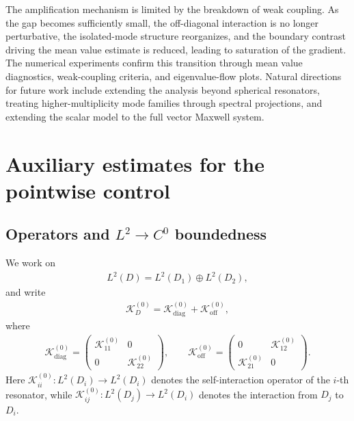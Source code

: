 \documentclass[10pt]{article}
\numberwithin{equation}{section}
\begin{document}
The amplification mechanism is limited by the breakdown of weak coupling. As the gap becomes sufficiently small, the off-diagonal interaction is no longer perturbative, the isolated-mode structure reorganizes, and the boundary contrast driving the mean value estimate is reduced, leading to saturation of the gradient. The numerical experiments confirm this transition through mean value diagnostics, weak-coupling criteria, and eigenvalue-flow plots. Natural directions for future work include extending the analysis beyond spherical resonators, treating higher-multiplicity mode families through spectral projections, and extending the scalar model to the full vector Maxwell system.











\appendix






\section{Auxiliary estimates for the pointwise control}
\label{app:Linfty-control}

\subsection{Operators and \texorpdfstring{$L^2\to C^0$}{} boundedness}

We work on
\begin{align*}
    L^2(D)=L^2(D_1)\oplus L^2(D_2),
\end{align*}
and write
\begin{align*}
    \mathcal{K}_D^{(0)}=\mathcal{K}_{\mathrm{diag}}^{(0)} + \mathcal{K}_{\mathrm{off}}^{(0)},
\end{align*}
where
\begin{align*}
    \mathcal{K}_{\mathrm{diag}}^{(0)}
    =
    \begin{pmatrix}
        \mathcal{K}_{11}^{(0)} & 0\\
        0 & \mathcal{K}_{22}^{(0)}
    \end{pmatrix},
    \qquad
    \mathcal{K}_{\mathrm{off}}^{(0)}
    =
    \begin{pmatrix}
        0 & \mathcal{K}_{12}^{(0)}\\
        \mathcal{K}_{21}^{(0)} & 0
    \end{pmatrix}.
\end{align*}
Here $\mathcal{K}_{ii}^{(0)}:L^2(D_i)\to L^2(D_i)$ denotes the self-interaction operator of the $i$-th resonator, while $\mathcal{K}_{ij}^{(0)}:L^2(D_j)\to L^2(D_i)$ denotes the interaction from $D_j$ to $D_i$.
\end{document}
